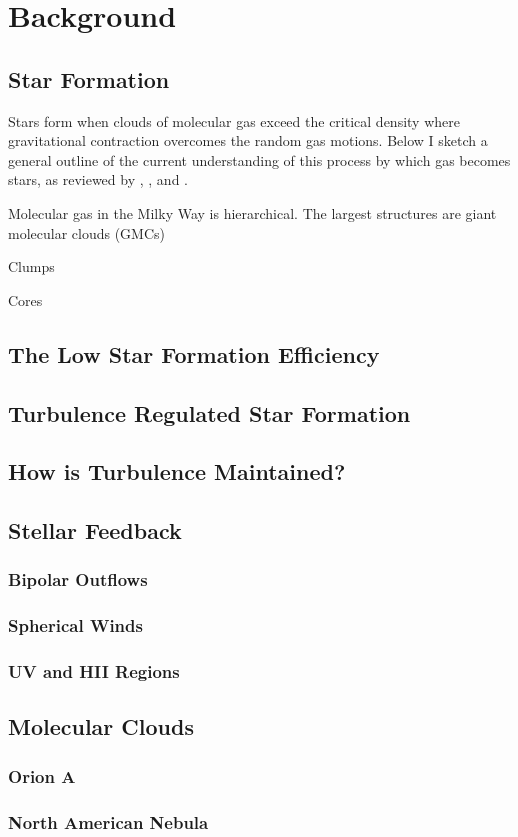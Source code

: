 \section{Background}

\subsection{Star Formation}
Stars form when clouds of molecular gas exceed the critical density where gravitational contraction overcomes the random gas motions. Below I sketch a general outline of the current understanding of this process by which gas becomes stars, as reviewed by \cite{McKee_2007}, \cite{Draine11}, and \cite{Dunham_2014}. 

Molecular gas in the Milky Way is hierarchical. The largest structures are giant molecular clouds (GMCs)

Clumps

Cores

\subsection{The Low Star Formation Efficiency}

\subsection{Turbulence Regulated Star Formation}

\subsection{How is Turbulence Maintained?}

\subsection{Stellar Feedback}

\subsubsection{Bipolar Outflows}

\subsubsection{Spherical Winds}

\subsubsection{UV and HII Regions}

\subsection{Molecular Clouds}

\subsubsection{Orion A}

\subsubsection{North American Nebula}
  
  
  
  
  